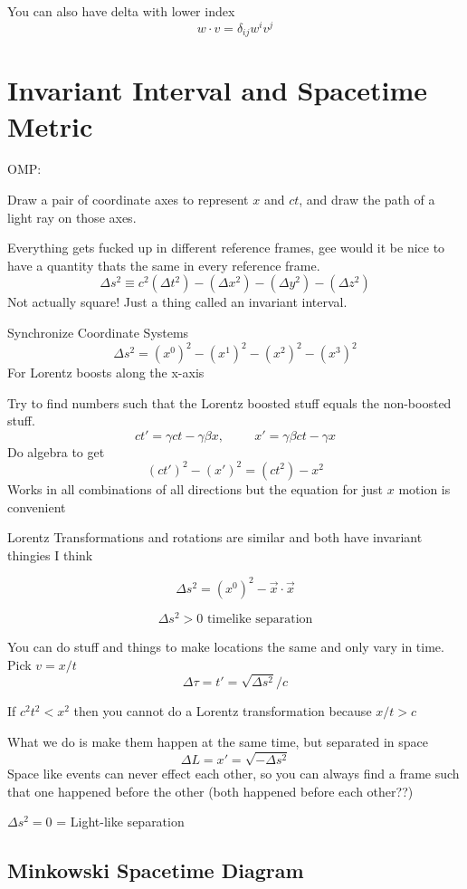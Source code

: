 \documentclass{report}
\begin{document}
You can also have delta with lower index
\[
w \cdot v = \delta_{ij}w^iv^j
\]


\chapter{Invariant Interval and Spacetime Metric}
OMP:

Draw a pair of coordinate axes to represent $x$ and $ct$, and draw the path of a light ray on those axes.

Everything gets fucked up in different reference frames, gee would it be nice to have a quantity thats the same in every reference frame.
\[
\Delta s^2 \equiv
c^2(\Delta t^2)
-
(\Delta x^2)
-
(\Delta y^2)
-
(\Delta z^2)
\]
Not actually square! Just a thing called an invariant interval.

Synchronize Coordinate Systems
\[
\Delta s^2 = 
(x^0)^2
-
(x^1)^2
-
(x^2)^2
-
(x^3)^2
\]
For Lorentz boosts along the x-axis

Try to find numbers such that the Lorentz boosted stuff equals the non-boosted stuff.
\[
ct' = \gamma ct - \gamma \beta x,
\hspace{1cm}
x' = \gamma \beta ct - \gamma x
\]
Do algebra to get
\[
(ct')^2 
- 
(x')^2 = 
(ct^2) 
- 
x^2
\]
Works in all combinations of all directions but the equation for just $x$ motion is convenient

Lorentz Transformations and rotations are similar and both have invariant thingies I think

\[
\Delta s^2 = (x^0)^2 - \vec{x} \cdot \vec{x}
\]


\[
\Delta s^2 > 0 \textrm{ timelike separation}
\]


You can do stuff and things to make locations the same and only vary in time. Pick $v = x/t$
\[
\Delta \tau = t' = \sqrt{\Delta s^2}/c
\]

If $c^2t^2 < x^2$ then you cannot do a Lorentz transformation because $x/t > c$

What we do is make them happen at the same time, but separated in space
\[
\Delta L = x' = \sqrt{- \Delta s^2}
\]
Space like events can never effect each other, so you can always find a frame such that one happened before the other (both happened before each other??)

$\Delta s^2 = 0$ = Light-like separation

\section{Minkowski Spacetime Diagram}
\end{document}

